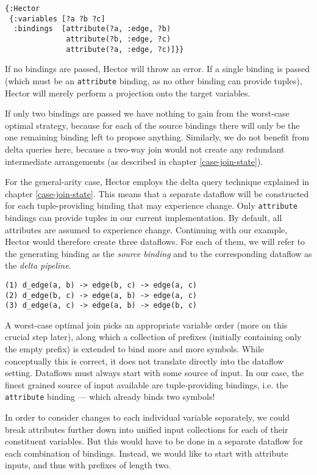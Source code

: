 \documentclass[../index.tex]{subfiles}
\begin{document}
\begin{verbatim}
{:Hector
 {:variables [?a ?b ?c]
  :bindings  [attribute(?a, :edge, ?b)
              attribute(?b, :edge, ?c)
              attribute(?a, :edge, ?c)]}}
\end{verbatim}

If no bindings are passed, Hector will throw an error. If a single
binding is passed (which must be an \texttt{attribute} binding, as no
other binding can provide tuples), Hector will merely perform a
projection onto the target variables.

If only two bindings are passed we have nothing to gain from the
worst-case optimal strategy, because for each of the source bindings
there will only be the one remaining binding left to propose
anything. Similarly, we do not benefit from delta queries here,
because a two-way join would not create any redundant intermediate
arrangements (as described in chapter \ref{case-join-state}).

For the general-arity case, Hector employs the delta query technique
explained in chapter \ref{case-join-state}. This means that a separate
dataflow will be constructed for each tuple-providing binding that may
experience change. Only \texttt{attribute} bindings can provide tuples
in our current implementation. By default, all attributes are assumed
to experience change. Continuing with our example, Hector would
therefore create three dataflows. For each of them, we will refer to
the generating binding as the \emph{source binding} and to the
corresponding dataflow as the \emph{delta pipeline}.

\begin{verbatim}
(1) d_edge(a, b) -> edge(b, c) -> edge(a, c)
(2) d_edge(b, c) -> edge(a, b) -> edge(a, c)
(3) d_edge(a, c) -> edge(a, b) -> edge(b, c)
\end{verbatim}

A worst-case optimal join picks an appropriate variable order (more on
this crucial step later), along which a collection of prefixes
(initially containing only the empty prefix) is extended to bind more
and more symbols. While conceptually this is correct, it does not
translate directly into the dataflow setting. Dataflows must always
start with some source of input. In our case, the finest grained
source of input available are tuple-providing bindings, i.e. the
\texttt{attribute} binding — which already binds two symbols!

In order to consider changes to each individual variable separately,
we could break attributes further down into unified input collections
for each of their constituent variables. But this would have to be
done in a separate dataflow for each combination of bindings. Instead,
we would like to start with attribute inputs, and thus with prefixes
of length two.
\end{document}
